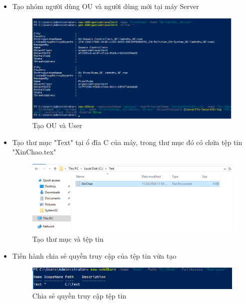 \begin{itemize}
    \newpage

    \item Tạo nhóm người dùng OU và người dùng mới tại máy Server
    \begin{figure}[htbp]
        \centering
        \includegraphics[width=0.5\linewidth]{coreRemoteAccess/createOU.png}
        \caption{Tạo OU và User}
    \end{figure}

    \item Tạo thư mục "Text" tại ổ đĩa C của máy, trong thư mục đó có chứa tệp tin "XinChao.tex"
    \begin{figure}[htbp]
        \centering
        \includegraphics[width=0.5\linewidth]{coreRemoteAccess/createFile.png}
        \caption{Tạo thư mục và tệp tin}
    \end{figure}

    \item Tiến hành chia sẻ quyền truy cập của tệp tin vừa tạo
    \begin{figure}[htbp]
        \centering
        \includegraphics[width=0.5\linewidth]{coreRemoteAccess/sharefile.png}
        \caption{Chia sẻ quyền truy cập tệp tin}
    \end{figure}
    
\end{itemize}

